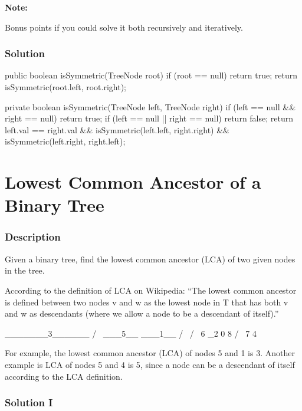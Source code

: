\textbf{Note:}

Bonus points if you could solve it both recursively and iteratively.

\subsubsection{Solution}
\begin{Code}
public boolean isSymmetric(TreeNode root) {
    if (root == null) {
        return true;
    }
    return isSymmetric(root.left, root.right);
}

private boolean isSymmetric(TreeNode left, TreeNode right) {
    if (left == null && right == null) {
        return true;
    }
    if (left == null || right == null) {
        return false;
    }
    return left.val == right.val && isSymmetric(left.left, right.right)
            && isSymmetric(left.right, right.left);
}
\end{Code}

\newpage

\section{Lowest Common Ancestor of a Binary Tree} %

\subsubsection{Description}
Given a binary tree, find the lowest common ancestor (LCA) of two given nodes in the tree.

According to the definition of LCA on Wikipedia: “The lowest common ancestor is defined between two nodes v and w as the lowest node in T that has both v and w as descendants (where we allow a node to be a descendant of itself).”
\begin{Code}
        _______3______
       /              \
    ___5__          ___1__
   /      \        /      \
   6      _2       0       8
         /  \
         7   4
\end{Code}

For example, the lowest common ancestor (LCA) of nodes 5 and 1 is 3. Another example is LCA of nodes 5 and 4 is 5, since a node can be a descendant of itself according to the LCA definition.

\subsubsection{Solution I}

